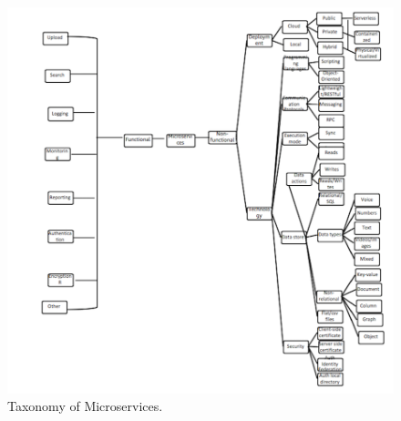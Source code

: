 \documentclass{article}
\begin{document}
\begin{figure}[h!]
\includegraphics{taxonomydiagram.png}
\caption{Taxonomy of Microservices.}
\end{figure}
\end{document}
